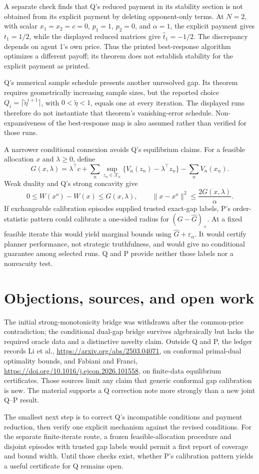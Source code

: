 \documentclass{article}
\begin{document}
A separate check finds that Q's reduced payment in its stability section is not obtained from its explicit payment by deleting opponent-only terms. At \(N=2\), with scalar \(x_1=x_2=c=0\), \(p_1=1\), \(p_2=0\), and \(\alpha=1\), the explicit payment gives \(t_1=1/2\), while the displayed reduced matrices give \(\widehat t_1=-1/2\). The discrepancy depends on agent 1's own price. Thus the printed best-response algorithm optimizes a different payoff; its theorem does not establish stability for the explicit payment as printed. 

Q's numerical sample schedule presents another unresolved gap. Its theorem requires geometrically increasing sample sizes, but the reported choice \(Q_i=\lceil\widetilde\eta^{i+1}\rceil\), with \(0<\widetilde\eta<1\), equals one at every iteration. The displayed runs therefore do not instantiate that theorem's vanishing-error schedule. Non-expansiveness of the best-response map is also assumed rather than verified for those runs. 

A narrower conditional connexion avoids Q's equilibrium claims. For a feasible allocation \(x\) and \(\lambda\geq0\), define
\[
G(x,\lambda)
=
\lambda^{\top}c+
\sum_n\sup_{z_n\in\mathcal X_n}
\bigl\{V_n(z_n)-\lambda^{\top}z_n\bigr\}
-\sum_n V_n(x_n).
\]
Weak duality and Q's strong concavity give
\[
0\leq W(x^o)-W(x)\leq G(x,\lambda),
\qquad
\lVert x-x^o\rVert^2\leq \frac{2G(x,\lambda)}{\alpha}.
\]
If exchangeable calibration episodes supplied trusted exact-gap labels, P's order-statistic pattern could calibrate a one-sided radius for \( (G-\widehat G)_+ \). At a fixed feasible iterate this would yield marginal bounds using \(\widehat G+\varepsilon_\alpha\). It would certify planner performance, not strategic truthfulness, and would give no conditional guarantee among selected runs. Q and P provide neither those labels nor a nonvacuity test. 

\section*{Objections, sources, and open work}

The initial strong-monotonicity bridge was withdrawn after the common-price contradiction; the conditional dual-gap bridge survives algebraically but lacks the required oracle data and a distinctive novelty claim. Outside Q and P, the ledger records Li et al., \url{https://arxiv.org/abs/2503.04071}, on conformal primal-dual optimality bounds, and Fabiani and Franci, \url{https://doi.org/10.1016/j.ejcon.2026.101558}, on finite-data equilibrium certificates. Those sources limit any claim that generic conformal gap calibration is new. The material supports a Q correction note more strongly than a new joint Q--P result. 

The smallest next step is to correct Q's incompatible conditions and payment reduction, then verify one explicit mechanism against the revised conditions. For the separate finite-iterate route, a frozen feasible-allocation procedure and disjoint episodes with trusted gap labels would permit a first report of coverage and bound width. Until those checks exist, whether P's calibration pattern yields a useful certificate for Q remains open. 
\end{document}
